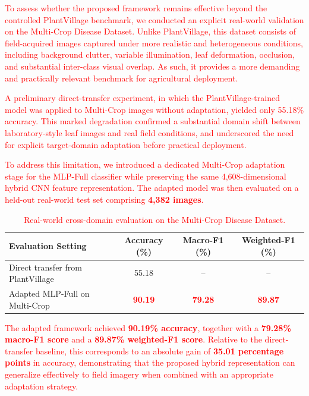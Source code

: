 \documentclass[pdflatex,sn-basic]{sn-jnl}
\begin{document}
\textcolor{red}{To assess whether the proposed framework remains effective beyond the controlled PlantVillage benchmark, we conducted an explicit real-world validation on the Multi-Crop Disease Dataset. Unlike PlantVillage, this dataset consists of field-acquired images captured under more realistic and heterogeneous conditions, including background clutter, variable illumination, leaf deformation, occlusion, and substantial inter-class visual overlap. As such, it provides a more demanding and practically relevant benchmark for agricultural deployment.}

\textcolor{red}{A preliminary direct-transfer experiment, in which the PlantVillage-trained model was applied to Multi-Crop images without adaptation, yielded only 55.18\% accuracy. This marked degradation confirmed a substantial domain shift between laboratory-style leaf images and real field conditions, and underscored the need for explicit target-domain adaptation before practical deployment.}

\textcolor{red}{To address this limitation, we introduced a dedicated Multi-Crop adaptation stage for the MLP-Full classifier while preserving the same 4,608-dimensional hybrid CNN feature representation. The adapted model was then evaluated on a held-out real-world test set comprising \textbf{4,382 images}.}

\begin{table}[htbp]
\centering
\caption{\textcolor{red}{Real-world cross-domain evaluation on the Multi-Crop Disease Dataset.}}
\label{tab:multicrop_results}
\begin{tabular*}{\textwidth}{@{\extracolsep\fill}lccc@{}}
\toprule
\textbf{Evaluation Setting} & \textbf{Accuracy (\%)} & \textbf{Macro-F1 (\%)} & \textbf{Weighted-F1 (\%)} \\
\midrule
Direct transfer from PlantVillage & 55.18 & -- & -- \\
Adapted MLP-Full on Multi-Crop & \textcolor{red}{\textbf{90.19}} & \textcolor{red}{\textbf{79.28}} & \textcolor{red}{\textbf{89.87}} \\
\bottomrule
\end{tabular*}
\end{table}

\textcolor{red}{The adapted framework achieved \textbf{90.19\% accuracy}, together with a \textbf{79.28\% macro-F1 score} and a \textbf{89.87\% weighted-F1 score}. Relative to the direct-transfer baseline, this corresponds to an absolute gain of \textbf{35.01 percentage points} in accuracy, demonstrating that the proposed hybrid representation can generalize effectively to field imagery when combined with an appropriate adaptation strategy.}
\end{document}

